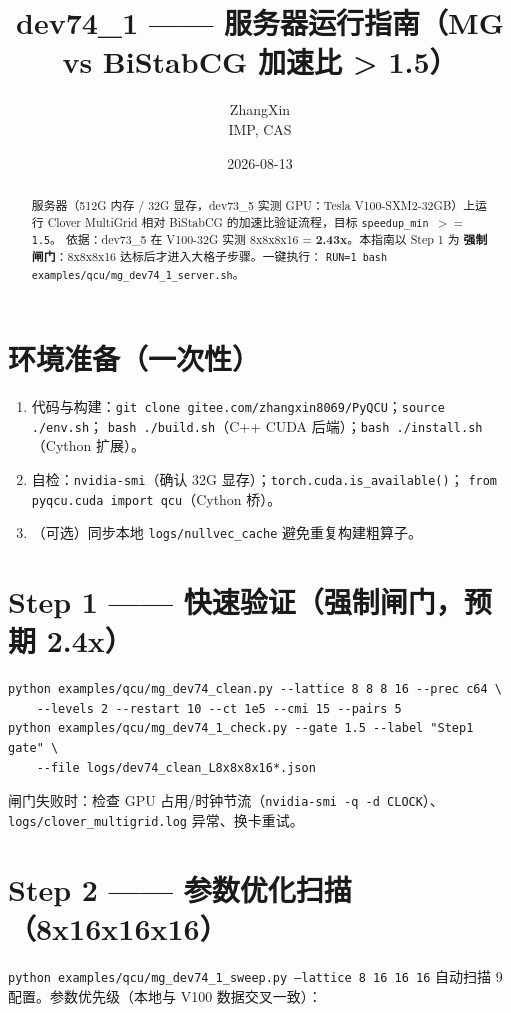 \documentclass[11pt,a4paper]{article}
\title{\textbf{dev74\_1 —— 服务器运行指南（MG vs BiStabCG 加速比 > 1.5）}}
\author{ZhangXin \\ IMP, CAS}
\date{2026-08-13}
\begin{document}
\maketitle

\begin{abstract}
服务器（512G 内存 / 32G 显存，dev73\_5 实测 GPU：Tesla V100-SXM2-32GB）上运行
Clover MultiGrid 相对 BiStabCG 的加速比验证流程，目标 \texttt{speedup\_min $>=$ 1.5}。
依据：dev73\_5 在 V100-32G 实测 8x8x8x16 = \textbf{2.43x}。本指南以 Step 1 为
\textbf{强制闸门}：8x8x8x16 达标后才进入大格子步骤。一键执行：
\texttt{RUN=1 bash examples/qcu/mg\_dev74\_1\_server.sh}。
\end{abstract}

\section{环境准备（一次性）}
\begin{enumerate}
  \item 代码与构建：\texttt{git clone gitee.com/zhangxin8069/PyQCU}；\texttt{source ./env.sh}；
    \texttt{bash ./build.sh}（C++ CUDA 后端）；\texttt{bash ./install.sh}（Cython 扩展）。
  \item 自检：\texttt{nvidia-smi}（确认 32G 显存）；\texttt{torch.cuda.is\_available()}；
    \texttt{from pyqcu.cuda import qcu}（Cython 桥）。
  \item （可选）同步本地 \texttt{logs/nullvec\_cache} 避免重复构建粗算子。
\end{enumerate}

\section{Step 1 —— 快速验证（强制闸门，预期 2.4x）}
\begin{verbatim}
python examples/qcu/mg_dev74_clean.py --lattice 8 8 8 16 --prec c64 \
    --levels 2 --restart 10 --ct 1e5 --cmi 15 --pairs 5
python examples/qcu/mg_dev74_1_check.py --gate 1.5 --label "Step1 gate" \
    --file logs/dev74_clean_L8x8x8x16*.json
\end{verbatim}
闸门失败时：检查 GPU 占用/时钟节流（\texttt{nvidia-smi -q -d CLOCK}）、
\texttt{logs/clover\_multigrid.log} 异常、换卡重试。

\section{Step 2 —— 参数优化扫描（8x16x16x16）}
\texttt{python examples/qcu/mg\_dev74\_1\_sweep.py --lattice 8 16 16 16}
自动扫描 9 配置。参数优先级（本地与 V100 数据交叉一致）：
\end{document}
